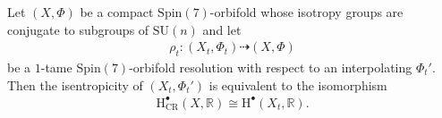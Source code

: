 \documentclass[psamsfonts]{amsart}
\theoremstyle{plain}
\theoremstyle{definition}{
\newtheorem{defi}{Definition}[section]
\newtheorem{ass}{Assumption}
\newtheorem*{nota}{Notation}}
\theoremstyle{remark}{
\newtheorem{rem}{Remark}
\newtheorem{ex}{Example}}
\theoremstyle{plain}{
\newtheorem{thm}{Theorem}[section]
\newtheorem{lem}{Lemma}[section]
\newtheorem{cor}{Corollary}[section]
\newtheorem{prop}{Proposition}[section]
\newtheorem{con}{Conjecture}[section]}
\newcommand{\m}[1]{{\mathrm{#1}}}
\begin{document}
\begin{thm}
\label{isentropicityequalcrepantresolution}
    Let $(X,\Phi)$ be a compact $\m{Spin}(7)$-orbifold whose isotropy groups are conjugate to subgroups of $\m{SU}(n)$ and let 
    \begin{align*}
        \rho_{t}\colon (X_t,\Phi_t)\dashrightarrow (X,\Phi)
    \end{align*}
   be a $1$-tame $\m{Spin}(7)$-orbifold resolution with respect to an interpolating $\Phi_t'$. Then the isentropicity of $(X_t,\Phi_t')$ is equivalent to the isomorphism 
    \begin{align*}
        \m{H}^\bullet_{\m{CR}}(X,\mathbb{R})\cong \m{H}^\bullet(X_t,\mathbb{R}).
    \end{align*}
\end{thm}






\end{document}
